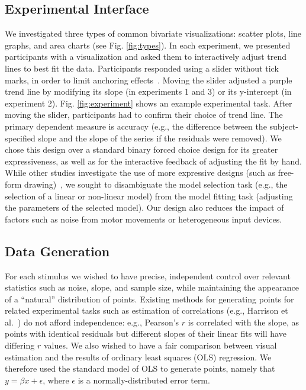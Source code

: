 \documentclass{sigchi}
\begin{document}
\subsection{Experimental Interface}
\typesFig

We investigated three types of common bivariate visualizations: scatter plots, line graphs, and area charts (see Fig. \ref{fig:types}). In each experiment, we presented participants with a visualization and asked them to interactively adjust trend lines to best fit the data.  Participants responded using a slider without tick marks, in order to limit anchoring effects~\cite{matejka2016effect}. Moving the slider adjusted a purple trend line by modifying its slope (in experiments 1 and 3) or its y-intercept (in experiment 2). Fig. \ref{fig:experiment} shows an example experimental task. After moving the slider, participants had to confirm their choice of trend line. The primary dependent measure is accuracy (e.g., the difference between the subject-specified slope and the slope of the series if the residuals were removed). We chose this design over a standard binary forced choice design for its greater expressiveness, as well as for the interactive feedback of adjusting the fit by hand. While other studies investigate the use of more expressive designs (such as free-form drawing)~\cite{kim2017}, we sought to disambiguate the model selection task (e.g., the selection of a linear or non-linear model) from the model fitting task (adjusting the parameters of the selected model). Our design also reduces the impact of factors such as noise from motor movements or heterogeneous input devices.

\subsection{Data Generation}

\sigmasFig

\trendtypesFig

For each stimulus we wished to have precise, independent control over relevant statistics such as noise, slope, and sample size, while maintaining the appearance of a ``natural'' distribution of points. Existing methods for generating points for related experimental tasks such as estimation of correlations (e.g., Harrison et al.~\cite{harrison2014ranking}) do not afford independence: e.g., Pearson's $r$ is correlated with the slope, as points with identical residuals but different slopes of their linear fits will have differing $r$ values. We also wished to have a fair comparison between visual estimation and the results of ordinary least squares (OLS) regression. We therefore used the standard model of OLS to generate points, namely that $y=\beta x + \epsilon$, where $\epsilon$ is a normally-distributed error term.
\end{document}
